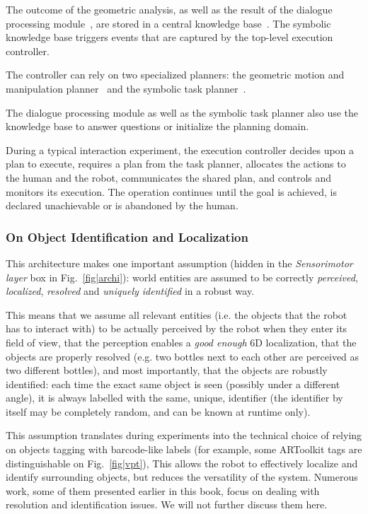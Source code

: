 \documentclass{svmult}
\newcommand{\ie}{i.e.\xspace}
\newcommand{\eg}{e.g.\xspace}
\begin{document}
The outcome of the geometric analysis, as well as the result of the dialogue
processing module~\cite{Lemaignan2011a}, are stored in a central knowledge
base~\cite{Lemaignan2010}. The symbolic knowledge base triggers events that are
captured by the top-level execution controller.

The controller can rely on two specialized planners: the geometric motion and
manipulation planner~\cite{Sisbot2008, Mainprice2011, Pandey2010} and the
symbolic task planner~\cite{Alili2008,desilva2015, gharbi2015}.

The dialogue processing module as well as the symbolic task planner also
use the knowledge base to answer questions or initialize the planning domain.

During a typical interaction experiment, the execution controller decides upon a
plan to execute, requires a plan from the task planner, allocates the actions to
the human and the robot, communicates the shared plan, and controls and
monitors its execution. The operation continues until the goal is achieved, is
declared unachievable or is abandoned by the human.



\subsubsection*{On Object Identification and Localization}

This architecture makes one important assumption (hidden in the
\emph{Sensorimotor layer} box in Fig.~\ref{fig|archi}): world entities are
assumed to be correctly \emph{perceived}, \emph{localized}, \emph{resolved} and
\emph{uniquely identified} in a robust way.

This means that we assume all relevant entities (\ie the objects that the robot has
to interact with) to be actually perceived by the robot when they enter its
field of view, that the perception enables a \emph{good enough} 6D
localization, that the objects are properly resolved (\eg two bottles next to
each other are perceived as two different bottles), and most importantly, that
the objects are robustly identified: each time the exact same object is seen
(possibly under a different angle), it is always labelled with the same,
unique, identifier (the identifier by itself may be completely random, and can
be known at runtime only).

This assumption translates during experiments into the technical choice of
relying on objects tagging with barcode-like labels (for example, some
ARToolkit tags are distinguishable on Fig.~\ref{fig|vpt}), This allows the robot to
effectively localize and identify surrounding objects, but reduces the
versatility of the system.  Numerous work, some of them presented earlier in
this book, focus on dealing with resolution and identification issues.  We will
not further discuss them here.
\end{document}
